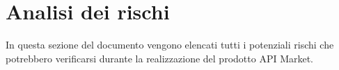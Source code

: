 \newpage
\section{Analisi dei rischi}
In questa sezione del documento vengono elencati tutti i potenziali rischi che potrebbero verificarsi durante la realizzazione del prodotto API Market.